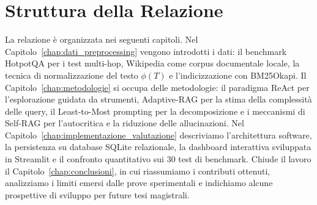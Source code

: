 \section{Struttura della Relazione}
\label{sec:struttura_relazione}

La relazione è organizzata nei seguenti capitoli. Nel Capitolo~\ref{chap:dati_preprocessing} vengono introdotti i dati: il benchmark HotpotQA per i test multi-hop, Wikipedia come corpus documentale locale, la tecnica di normalizzazione del testo $\phi(T)$ e l'indicizzazione con BM25Okapi. Il Capitolo~\ref{chap:metodologie} si occupa delle metodologie: il paradigma ReAct per l'esplorazione guidata da strumenti, Adaptive-RAG per la stima della complessità delle query, il Least-to-Most prompting per la decomposizione e i meccanismi di Self-RAG per l'autocritica e la riduzione delle allucinazioni. Nel Capitolo~\ref{chap:implementazione_valutazione} descriviamo l'architettura software, la persistenza su database SQLite relazionale, la dashboard interattiva sviluppata in Streamlit e il confronto quantitativo sui 30 test di benchmark. Chiude il lavoro il Capitolo~\ref{chap:conclusioni}, in cui riassumiamo i contributi ottenuti, analizziamo i limiti emersi dalle prove sperimentali e indichiamo alcune prospettive di sviluppo per future tesi magistrali.
